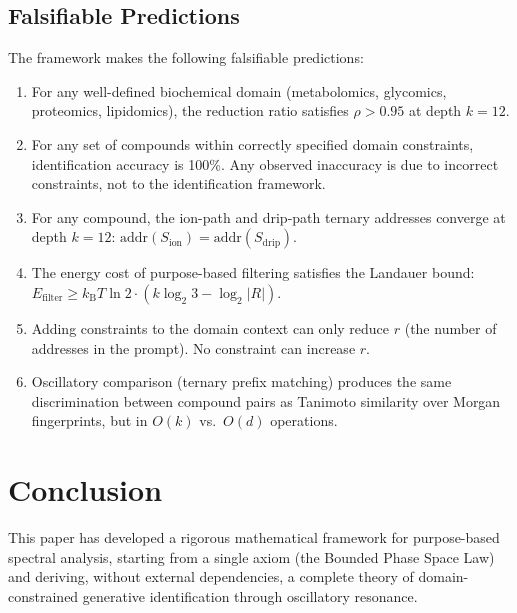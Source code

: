 \documentclass[11pt,twocolumn,a4paper]{article}
\theoremstyle{definition}
\theoremstyle{remark}
\newcommand{\kB}{k_{\mathrm{B}}}
\begin{document}
\subsection{Falsifiable Predictions}\label{sec:predictions}

The framework makes the following falsifiable predictions:

\begin{enumerate}[label=\textbf{P\arabic*:}]
  \item For any well-defined biochemical domain (metabolomics, glycomics, proteomics, lipidomics), the reduction ratio satisfies $\rho > 0.95$ at depth $k = 12$.

  \item For any set of compounds within correctly specified domain constraints, identification accuracy is 100\%. Any observed inaccuracy is due to incorrect constraints, not to the identification framework.

  \item For any compound, the ion-path and drip-path ternary addresses converge at depth $k = 12$: $\mathrm{addr}(S_{\mathrm{ion}}) = \mathrm{addr}(S_{\mathrm{drip}})$.

  \item The energy cost of purpose-based filtering satisfies the Landauer bound: $E_{\mathrm{filter}} \geq \kB T \ln 2 \cdot (k \log_2 3 - \log_2 |R|)$.

  \item Adding constraints to the domain context can only reduce $r$ (the number of addresses in the prompt). No constraint can increase $r$.

  \item Oscillatory comparison (ternary prefix matching) produces the same discrimination between compound pairs as Tanimoto similarity over Morgan fingerprints, but in $O(k)$ vs.\ $O(d)$ operations.
\end{enumerate}

\section{Conclusion}\label{sec:conclusion}

This paper has developed a rigorous mathematical framework for purpose-based spectral analysis, starting from a single axiom (the Bounded Phase Space Law) and deriving, without external dependencies, a complete theory of domain-constrained generative identification through oscillatory resonance.
\end{document}
